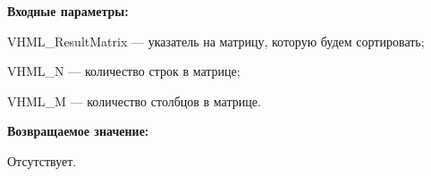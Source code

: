 \textbf{Входные параметры:}
 
VHML\_ResultMatrix --- указатель на матрицу, которую будем сортировать;
 
VHML\_N --- количество строк в матрице;
 
VHML\_M --- количество столбцов в матрице.

\textbf{Возвращаемое значение:}

Отсутствует.